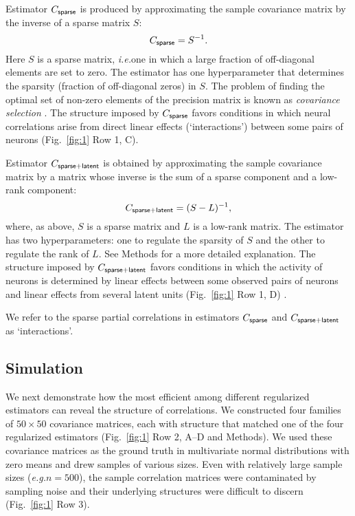 {Estimator $C_{\sf sparse}$ is produced by approximating the sample covariance matrix by the inverse of a sparse matrix $S$:
\begin{equation}\label{eq:c-sparse}
C_{\sf sparse} = S^{-1}.
\end{equation}
Here $S$ is a sparse matrix, \emph{i.e.}\;one in which a large fraction of off-diagonal elements are set to zero.  The estimator has one hyperparameter that determines the sparsity (fraction of off-diagonal zeros) in $S$. The problem of finding the optimal set of non-zero elements of the precision matrix is known as \emph{covariance selection} \cite{Dempster:1972}. The structure imposed by $C_{\sf sparse}$ favors conditions in which neural correlations arise from direct linear effects (`interactions') between some pairs of neurons (Fig.~\ref{fig:1}} Row 1, C).

Estimator $C_{\sf sparse+latent}$ is obtained by approximating the sample covariance matrix by a matrix whose inverse is the sum of a sparse component and a low-rank component:
\begin{equation}\label{eq:c-sl}
C_{\sf sparse+latent} = (S - L)^{-1},
\end{equation}
where, as above, $S$ is a sparse matrix and $L$ is a low-rank matrix. The estimator has two hyperparameters: one to regulate the sparsity of $S$ and the other to regulate the rank of $L$. See Methods for a more detailed explanation. The structure imposed by $C_{\sf sparse+latent}$ favors conditions in which the activity of neurons is determined by linear effects between some observed pairs of neurons and linear effects from several latent units (Fig.~\ref{fig:1} Row 1, D) \cite{Chandrasekaran:2010,Ma:2013}.

We refer to the sparse partial correlations in estimators $C_{\sf sparse}$ and $C_{\sf sparse+latent}$ as `interactions'.

\subsection*{Simulation}
We next demonstrate how the most efficient among different regularized estimators can reveal the structure of correlations.
We constructed four families of $50\times 50$ covariance matrices, each with structure that matched one of the four regularized estimators (Fig.~\ref{fig:1} Row 2, A--D and Methods).  We used these covariance matrices as the ground truth in multivariate normal distributions with zero means and drew samples of various sizes. Even with relatively large sample sizes (\emph{e.g.}\;$n=500$), the sample correlation matrices were contaminated by sampling noise and their underlying structures were difficult to discern (Fig.~\ref{fig:1} Row 3).

